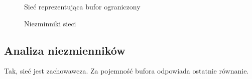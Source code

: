 \begin{figure}[h!]
	\caption{Sieć reprezentująca bufor ograniczony}
	\label{zad2:graph1}
\end{figure}

\begin{figure}[h!]
	\caption{Niezminniki sieci}
	\label{zad2:graph1}
\end{figure}


\subsection{Analiza niezmienników}
Tak, sieć jest zachowawcza. 
Za pojemność bufora odpowiada ostatnie równanie.